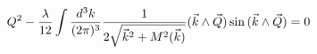 \begin{equation}\label{trentasei}
Q^2  -  {\lambda \over 12} \int \frac{d^3 k}{(2\pi)^3} \frac{1}{2\sqrt{\vec k^2+M^2(\vec k)}}( \vec k  \wedge \vec Q)\sin {( \vec k  \wedge \vec Q)}
=0
\end{equation}

